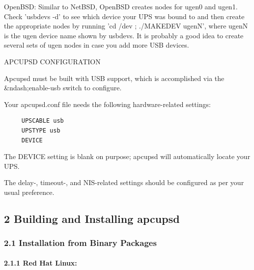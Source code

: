 OpenBSD: Similar to NetBSD, OpenBSD creates nodes for ugen0 and ugen1. Check
'usbdevs -d' to see which device your UPS was bound to and then create the
appropriate nodes by running 'cd /dev ; ./MAKEDEV ugenN', where ugenN is the
ugen device name shown by usbdevs. It is probably a good idea to create
several sets of ugen nodes in case you add more USB devices.  

APCUPSD CONFIGURATION  

Apcupsd must be built with USB support, which is accomplished via the
\&ndash;enable-usb switch to configure.  

Your apcupsd.conf file needs the following hardware-related settings: 

\footnotesize
\begin{verbatim}
     UPSCABLE usb
     UPSTYPE usb
     DEVICE
\end{verbatim}
\normalsize

The DEVICE setting is blank on purpose; apcupsd will automatically locate your
UPS.  

The delay-, timeout-, and NIS-related settings should be configured as per
your usual preference. 

\label{Building-and-Installing-apcupsd}

\subsection*{2 Building and Installing apcupsd}

\label{index-Building-18}
\label{index-Installing-19}

\label{Installation-from-Binary-Packages}

\subsubsection*{2.1 Installation from Binary Packages}

\label{Red-Hat-Linux}

\paragraph*{2.1.1 Red Hat Linux:}

